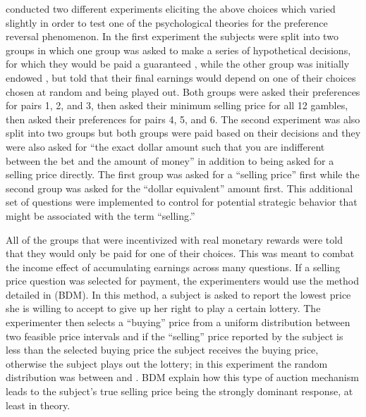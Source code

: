 \documentclass[../main.tex]{subfiles}
\begin{document}
\textcite{Grether1979} conducted two different experiments eliciting the above choices which  varied slightly in order to test one of the psychological theories for the preference reversal phenomenon.
In the first experiment the subjects were split into two groups in which one group was asked to make a series of hypothetical decisions, for which they would be paid a guaranteed , while the other group was initially endowed , but told that their final earnings would depend on one of their choices chosen at random and being played out.
Both groups were asked their preferences for pairs 1, 2, and 3, then asked their minimum selling price for all 12 gambles, then asked their preferences for pairs 4, 5, and 6.
The second experiment was also split into two groups but both groups were paid based on their decisions and they were also asked for \enquote{the exact dollar amount such that you are indifferent between the bet and the amount of money} in addition to being asked for a selling price directly.
The first group was asked for a \enquote{selling price} first while the second group was asked for the \enquote{dollar equivalent} amount first.
This additional set of questions were implemented to control for potential strategic behavior that might be associated with the term \enquote{selling.}

All of the groups that were incentivized with real monetary rewards were told that they would only be paid for one of their choices.
This was meant to combat the income effect of accumulating earnings across many questions.
If a selling price question was selected for payment, the experimenters would use the method detailed in \textcite{Becker1964} (BDM).
In this method, a subject is asked to report the lowest price she is willing to accept to give up her right to play a certain lottery.
The experimenter then selects a \enquote{buying} price from a uniform distribution between two feasible price intervals and if the \enquote{selling} price reported by the subject is less than the selected buying price the subject receives the buying price, otherwise the subject plays out the lottery; in this experiment the random distribution was between  and .
BDM explain how this type of auction mechanism leads to the subject's true selling price being the strongly dominant response, at least in theory.
\end{document}
